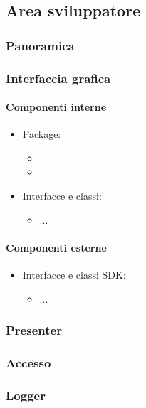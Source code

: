 \documentclass[../Funzionalita.tex]{subfiles}
\begin{document}
\subsection{Area sviluppatore}
\label{subsec:AreaSviluppatore}
	
	\subsubsection{Panoramica}

	\subsubsection{Interfaccia grafica}
			\paragraph*{Componenti interne}
			\begin{itemize}
			
				\item Package:
				\begin{itemize}
					\item[]
					\item[]
				\end{itemize}
				
				\item Interfacce e classi:
				\begin{itemize}
					\item[] ...
				\end{itemize}
				
			\end{itemize}
			
			
			\paragraph*{Componenti esterne}
			
			\begin{itemize}
				\item Interfacce e classi SDK:
				\begin{itemize}
					\item[] ...
				\end{itemize}
			\end{itemize}
			
	\subsubsection{Presenter}
	
	
	\subsubsection{Accesso}
	
	\subsubsection{Logger}
\end{document}
